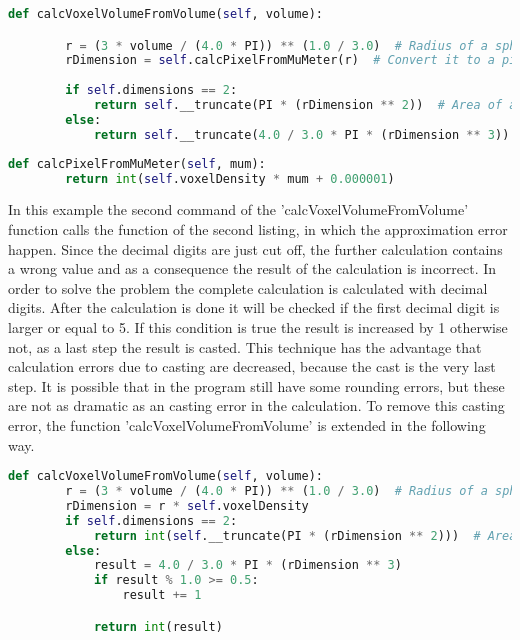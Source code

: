 \begin{lstlisting}[language=Python, caption=example of an calculation error because of an too early executed cast]
    def calcVoxelVolumeFromVolume(self, volume):

        r = (3 * volume / (4.0 * PI)) ** (1.0 / 3.0)  # Radius of a sphere with known volume.
        rDimension = self.calcPixelFromMuMeter(r)  # Convert it to a pixel unit.
        
        if self.dimensions == 2:
            return self.__truncate(PI * (rDimension ** 2))  # Area of a circle.
        else:
			return self.__truncate(4.0 / 3.0 * PI * (rDimension ** 3)) # Volume of a sphere.
\end{lstlisting}
\begin{lstlisting}[language=Python, caption=function to convert values of \SI{}{\micro\metre} into pixel]
    def calcPixelFromMuMeter(self, mum):
		return int(self.voxelDensity * mum + 0.000001)
\end{lstlisting}

In this example the second command of the 'calcVoxelVolumeFromVolume' function calls the function of the second listing, in which the approximation error happen. Since the decimal digits are just cut off, the further calculation contains a wrong value and as a consequence the result of the calculation is incorrect. \newline
In order to solve the problem the complete calculation is calculated with decimal digits. After the calculation is done it will be checked if the first decimal digit is larger or equal to 5. If this condition is true the result is increased by 1 otherwise not, as a last step the result is casted. This technique has the advantage that calculation errors due to casting are decreased, because the cast is the very last step. It is possible that in the program still have some rounding errors, but these are not as dramatic as an casting error in the calculation. To remove this casting error, the function 'calcVoxelVolumeFromVolume' is extended in the following way.

\begin{lstlisting}[language=Python, caption = the same function as before but without approximation errors\, because the cast and the rounding is done after the calculation]
   def calcVoxelVolumeFromVolume(self, volume):
        r = (3 * volume / (4.0 * PI)) ** (1.0 / 3.0)  # Radius of a sphere with known volume.
        rDimension = r * self.voxelDensity
        if self.dimensions == 2:
            return int(self.__truncate(PI * (rDimension ** 2)))  # Area of a circle.
        else:
            result = 4.0 / 3.0 * PI * (rDimension ** 3)
            if result % 1.0 >= 0.5:
                result += 1

            return int(result)
\end{lstlisting}

